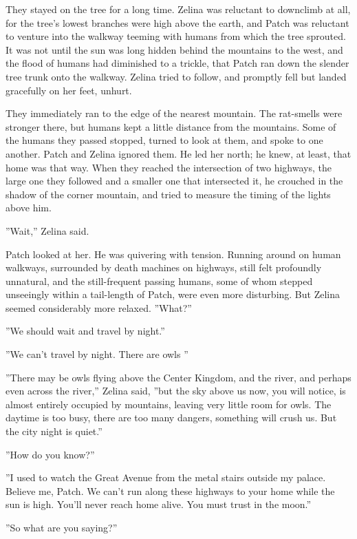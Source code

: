 \documentclass[11pt]{article}
\begin{document}
 They stayed on the tree for a long time. Zelina was reluctant to downclimb at all, for the tree's lowest branches were high above the earth, and Patch was reluctant to venture into the walkway teeming with humans from which the tree sprouted. It was not until the sun was long hidden behind the mountains to the west, and the flood of humans had diminished to a trickle, that Patch ran down the slender tree trunk onto the walkway. Zelina tried to follow, and promptly fell %
 but landed gracefully on her feet, unhurt.\par
 They immediately ran to the edge of the nearest mountain. The rat-smells were stronger there, but humans kept a little distance from the mountains. Some of the humans they passed stopped, turned to look at them, and spoke to one another. Patch and Zelina ignored them. He led her north; he knew, at least, that home was that way. When they reached the intersection of two highways, the large one they followed and a smaller one that intersected it, he crouched in the shadow of the corner mountain, and tried to measure the timing of the lights above him.\par
 ''Wait,'' Zelina said.\par
 Patch looked at her. He was quivering with tension. Running around on human walkways, surrounded by death machines on highways, still felt profoundly unnatural, and the still-frequent passing humans, some of whom stepped unseeingly within a tail-length of Patch, were even more disturbing. But Zelina seemed considerably more relaxed. ''What?''\par
 ''We should wait and travel by night.''\par
 ''We can't travel by night. There are owls %
''\par
 ''There may be owls flying above the Center Kingdom, and the river, and perhaps even across the river,'' Zelina said, ''but the sky above us now, you will notice, is almost entirely occupied by mountains, leaving very little room for owls. The daytime is too busy, there are too many dangers, something will crush us. But the city night is quiet.''\par
 ''How do you know?''\par
 ''I used to watch the Great Avenue from the metal stairs outside my palace. Believe me, Patch. We can't run along these highways to your home while the sun is high. You'll never reach home alive. You must trust in the moon.''\par
 ''So what are you saying?''\par
\end{document}
